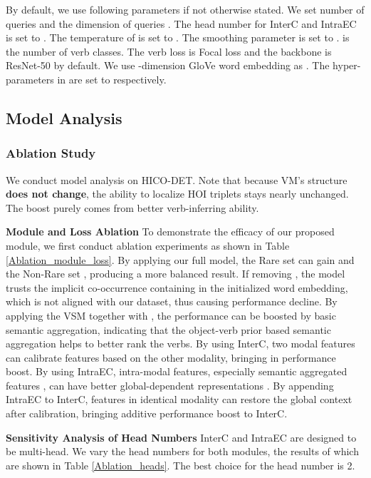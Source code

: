\documentclass[letterpaper]{article} \usepackage{aaai22}  \usepackage{times}  \usepackage{helvet}  \usepackage{courier}  \usepackage[hyphens]{url}  \usepackage{graphicx} \urlstyle{rm} \def\UrlFont{\rm}  \usepackage{natbib}  \usepackage{caption} \DeclareCaptionStyle{ruled}{labelfont=normalfont,labelsep=colon,strut=off} \frenchspacing  \setlength{\pdfpagewidth}{8.5in}  \setlength{\pdfpageheight}{11in}  \usepackage{algorithm}
\begin{document}
By default, we use following parameters if not otherwise stated. We set number of queries  and the dimension of queries . The head number  for InterC and IntraEC is set to . The temperature  of  is set to . The smoothing parameter  is set to .  is the number of verb classes. The verb loss is Focal loss and the backbone is ResNet-50 by default. We use -dimension GloVe word embedding \cite{pennington2014glove} as . The hyper-parameters  in  are set to  respectively.



\subsection{Model Analysis}
\subsubsection{Ablation Study} We conduct model analysis on HICO-DET. Note that because VM's structure \textbf{does not change}, the ability to localize HOI triplets stays nearly unchanged. The boost purely comes from better verb-inferring ability. 


\textbf{Module and Loss Ablation} To demonstrate the efficacy of our proposed module, we first conduct ablation experiments as shown in Table \ref{Ablation_module_loss}. By applying our full model, the Rare set can gain  and the Non-Rare set , producing a more balanced result. If removing , the model trusts the implicit co-occurrence containing in the initialized word embedding, which is not aligned with our dataset, thus causing performance decline. By applying the VSM together with , the performance can be boosted by basic semantic aggregation, indicating that the object-verb prior based semantic aggregation helps to better rank the verbs. By using InterC, two modal features can calibrate features based on the other modality, bringing in performance boost. By using IntraEC, intra-modal features, especially semantic aggregated features , can have better global-dependent representations \cite{AttentionAlluNeed}. By appending IntraEC to InterC, features in identical modality can restore the global context after calibration, bringing additive performance boost to InterC. 



\textbf{Sensitivity Analysis of Head Numbers} InterC and IntraEC are designed to be multi-head. We vary the head numbers for both modules, the results of which are shown in Table \ref{Ablation_heads}. The best choice for the head number is 2.
\end{document}
